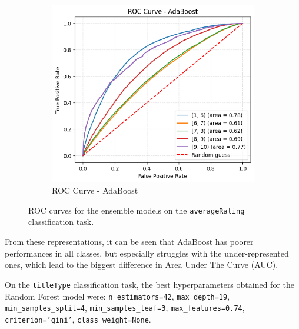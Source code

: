 \begin{figure}[h]
\begin{subfigure}[b]{0.45\textwidth}
        \includegraphics[width=\textwidth]{plotsss/roc_boost_rating}
        \caption{ROC Curve - AdaBoost}
        \label{fig:roc_ab}
    \end{subfigure}
    \caption{ROC curves for the ensemble models on the \texttt{averageRating} classification task.}
    \label{fig:roc_comparison}
\end{figure}
From these representations, it can be seen that AdaBoost has
poorer performances in all classes, but especially struggles
with the under-represented ones, which lead to the biggest
difference in Area Under The Curve (AUC).


On the \texttt{titleType} classification task, the best hyperparameters
obtained for the Random Forest model were:
\texttt{n\_estimators=42}, \texttt{max\_depth=19}, \texttt{min\_samples\_split=4},
\texttt{min\_samples\_leaf=3}, \texttt{max\_features=0.74},
\texttt{criterion='gini'}, \texttt{class\_weight=None}.



